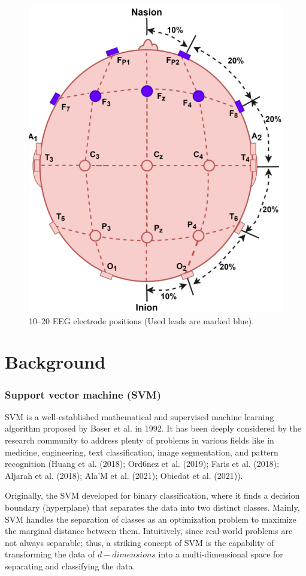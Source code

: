 \begin{figure}[htbp]
\centering
\includegraphics[width=0.8\linewidth]{images/b92d712fcf89518a10c69122e1cfe2f27d2373e33993274427d2dc4380668c54.jpg}
\caption{10–20 EEG electrode positions (Used leads are marked blue).}
\label{fig:1}
\end{figure}


\section{Background}

\subsubsection{Support vector machine (SVM)}

SVM is a well-established mathematical and supervised machine learning algorithm proposed by Boser et al. in 1992. It has been deeply considered by the research community to address plenty of problems in various fields like in medicine, engineering, text classification, image segmentation, and pattern recognition (Huang et al. (2018); Ord6nez et al. (2019); Faris et al. (2018); Aljarah et al. (2018); Ala’M et al. (2021); Obiedat et al. (2021)).

Originally, the SVM developed for binary classification, where it finds a decision boundary (hyperplane) that separates the data into two distinct classes. Mainly, SVM handles the separation of classes as an optimization problem to maximize the marginal distance between them. Intuitively, since real-world problems are not always separable; thus, a striking concept of SVM is the capability of transforming the data of $d-d i m e n s i o n s$ into a multi-dimensional space for separating and classifying the data.

